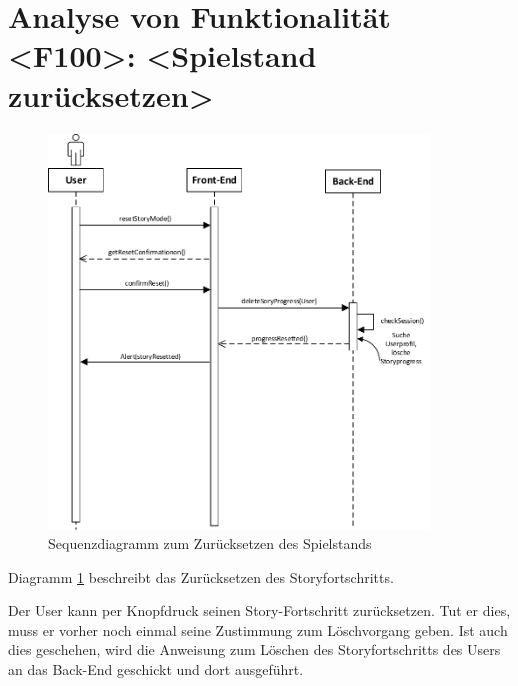 \section{Analyse von Funktionalität <F100>: <Spielstand zurücksetzen>}
\begin{figure}[h]
\centering
\includegraphics[width=0.9\textwidth]{figures/sequenz_F100.pdf}
\caption{Sequenzdiagramm zum Zurücksetzen des Spielstands}
\label{sequence_f100}
\end{figure}
Diagramm \ref{sequence_f100} beschreibt das Zurücksetzen des Storyfortschritts.

Der User kann per Knopfdruck seinen Story-Fortschritt zurücksetzen. Tut er dies, muss er vorher noch einmal seine Zustimmung zum Löschvorgang geben. Ist auch dies geschehen, wird die Anweisung zum Löschen des Storyfortschritts des Users an das Back-End geschickt und dort ausgeführt.

\newpage
